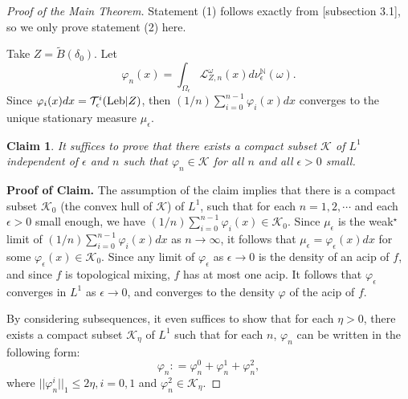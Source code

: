 \documentclass[11pt,oneside]{article}
\newtheorem*{claim}{Claim}
\theoremstyle{plain}
\numberwithin{equation}{section}
\numberwithin{figure}{section}
\numberwithin{table}{section}
\begin{document}
\begin{proof}[Proof of the Main Theorem] 

Statement (1) follows exactly from \cite{S}[subsection 3.1], so we only prove statement (2) here.

Take $Z = \tilde B(\delta_0)$. Let 
\[
\varphi_n(x) = \int_{\Omega_{\epsilon}} \mathcal L_{Z, n}^{\omega} (x) d \nu_{\epsilon}^{\mathbb N}(\omega).
\]
Since $\varphi_i(x) dx = \mathcal T_{\epsilon}^i ({\rm Leb} |Z)$, then $(1/n) \sum_{i=0}^{n-1} \varphi_i(x) dx$ converges to the unique stationary measure $\mu_{\epsilon}$. 

\begin{claim}
It suffices to prove that there exists a compact subset $\mathcal K$ of $L^1$  independent of $\epsilon$ and $n$ such that $\varphi_n \in \mathcal K$ for all $n$ and all $\epsilon >0$ small.  
\end{claim}

\noindent
{\bf Proof of Claim.} The assumption of the claim implies that there is a compact subset $\mathcal K_0$ (the convex hull of $\mathcal K$) of $L^1$, such that for each $n = 1, 2, \cdots $ and each $\epsilon > 0$ small enough, we have $(1/n) \sum_{i=0}^{n-1} \varphi_i (x) \in \mathcal K_0$. Since $\mu_{\epsilon}$ is the weak$^{\star}$ limit of $(1/n) \sum_{i=0}^{n-1} \varphi_i (x) dx $ as $n \to \infty$, it follows that $\mu_{\epsilon} = \varphi_{\epsilon} (x) dx$ for some $\varphi_{\epsilon}(x) \in \mathcal K_0$. Since any limit of $\varphi_{\epsilon}$ as $\epsilon \to 0$ is the density of an acip of $f$, and since $f$ is topological mixing, $f$ has at most one acip. It follows that $\varphi_{\epsilon}$ converges in $L^1$ as $\epsilon \to 0$, and converges to the density $\varphi$ of the acip of $f$.


By considering subsequences, it even suffices to show that for each $\eta >0$, there exists a compact subset $\mathcal K_{\eta} $ of $L^1$ such that for each $n$, $\varphi_n$ can be written in the following form:
\begin{equation}
\varphi_n : = \varphi_n^0 + \varphi_n^1 + \varphi_n^2,
\end{equation}
where $||\varphi_n^i||_1 \leq 2 \eta, i =0, 1$ and $\varphi_n^2 \in \mathcal K_{\eta}$.



\end{proof}
\end{document}
